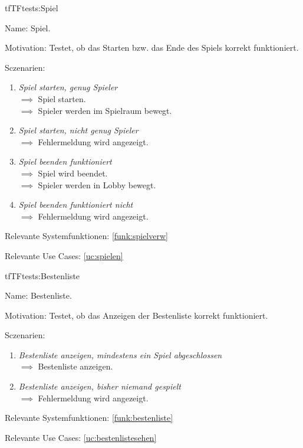 \begin{description}[leftmargin=5em, style=sameline]

\begin{lhp}{tf}{TF}{tests:Spiel}
	\item [Name:] Spiel.
	\item [Motivation:] Testet, ob das Starten bzw. das Ende des Spiels korrekt funktioniert.
	\item [Sczenarien:] \hfill
		\begin{enumerate}
			\item \textit{Spiel starten, genug Spieler} \\ $\implies$ Spiel starten.
														\\ $\implies$ Spieler werden im Spielraum bewegt.
			\item \textit{Spiel starten, nicht genug Spieler} \\ $\implies$ Fehlermeldung wird angezeigt.
			\item \textit{Spiel beenden funktioniert} \\ $\implies$ Spiel wird  beendet.
													  \\ $\implies$ Spieler werden  in Lobby bewegt.
			\item \textit{Spiel beenden funktioniert nicht} \\ $\implies$ Fehlermeldung wird angezeigt.
		\end{enumerate}
	\item [Relevante Systemfunktionen:] \ref{funk:spielverw}
	\item [Relevante Use Cases:] \ref{uc:spielen}
\end{lhp}

\end{description}


\begin{description}[leftmargin=5em, style=sameline]

\begin{lhp}{tf}{TF}{tests:Bestenliste}
	\item [Name:] Bestenliste.
	\item [Motivation:] Testet, ob das Anzeigen der Bestenliste  korrekt funktioniert.
	\item [Sczenarien:] \hfill
		\begin{enumerate}
			\item \textit{Bestenliste anzeigen, mindestens ein Spiel abgeschlossen} \\ $\implies$ Bestenliste anzeigen.
			\item \textit{Bestenliste anzeigen, bisher niemand gespielt} \\ $\implies$ Fehlermeldung wird angezeigt.
		\end{enumerate}
	\item [Relevante Systemfunktionen:] \ref{funk:bestenliste}
	\item [Relevante Use Cases:] \ref{uc:bestenlistesehen}
\end{lhp}

\end{description}


